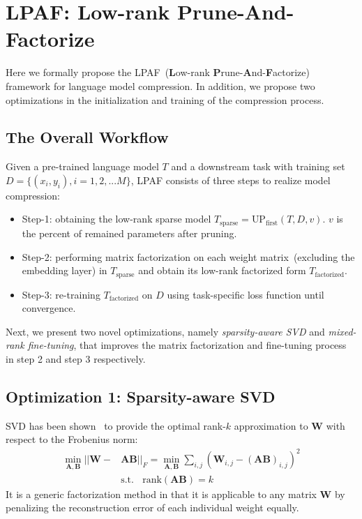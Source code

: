 \section{LPAF: Low-rank Prune-And-Factorize}
\label{sec:approach}
Here we formally propose the LPAF~(\textbf{L}ow-rank \textbf{P}rune-\textbf{A}nd-\textbf{F}actorize) framework 
for language model compression. In addition, 
we propose two optimizations in the 
initialization and training of the compression process.

\subsection{The Overall Workflow}
\label{sec:ptf}
Given a pre-trained language model $T$ and a downstream task with training set $D=\{(x_i, y_i), i=1,2,...M\}$, LPAF consists of three steps to realize model compression: 
\begin{itemize}
	\item Step-1: obtaining the low-rank sparse model $T_{\text{sparse}}=\text{UP}_\text{first}(T,D, v)$. $v$ is the percent of remained parameters after pruning.
	\item Step-2:  performing matrix factorization on each weight matrix~(excluding the embedding layer) in $T_{\text{sparse}}$ and  obtain its low-rank factorized form $T_{\text{factorized}}$. 
	\item Step-3:  re-training $T_{\text{factorized}}$ on $D$ using task-specific loss function until convergence. 
\end{itemize}

Next, we present two novel optimizations, namely \textit{sparsity-aware SVD} and \textit{mixed-rank fine-tuning}, that improves the matrix factorization and fine-tuning process in step 2 and step 3 respectively.

\subsection{Optimization 1: Sparsity-aware SVD}
\label{sec:sasvd}
SVD has been shown~\cite{bestsvd} to provide the optimal rank-$k$ approximation to $\bm{W}$ with respect to the Frobenius norm:
\begin{align}
	\nonumber
	\min_{\bm{A},\bm{B}} ||\bm{W}-&\bm{A}\bm{B}||_{F}=\min_{\bm{A},\bm{B}} \sum_{i,j}(\bm{W}_{i,j}-(\bm{AB})_{i,j})^2 \\
	& \text{s.t.}~~~~\text{rank}(\bm{AB})=k
\end{align}
It is a generic factorization method in that it is applicable to any matrix $\bm{W}$ by penalizing the reconstruction error of each individual weight equally. 

